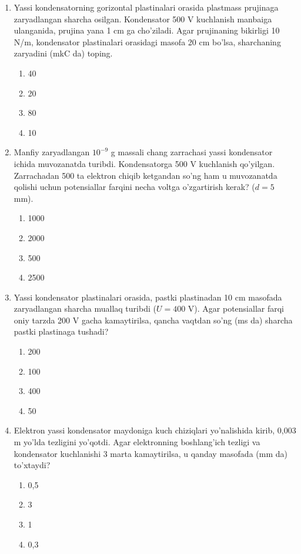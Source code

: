 \begin{enumerate}
    \item Yassi kondensatorning gorizontal plastinalari orasida plastmass prujinaga zaryadlangan sharcha osilgan. Kondensator 500 V kuchlanish manbaiga ulanganida, prujina yana 1 cm ga cho’ziladi. Agar prujinaning bikirligi 10 N/m, kondensator plastinalari orasidagi masofa 20 cm bo’lsa, sharchaning zaryadini (mkC da) toping.
    \begin{enumerate}[label=\Alph*)]
        \item 40 %
        \item 20
        \item 80
        \item 10
    \end{enumerate}

    \item Manfiy zaryadlangan $10^{-9}$ g massali chang zarrachasi yassi kondensator ichida muvozanatda turibdi. Kondensatorga 500 V kuchlanish qo'yilgan. Zarrachadan 500 ta elektron chiqib ketgandan so’ng ham u muvozanatda qolishi uchun potensiallar farqini necha voltga o’zgartirish kerak? ($d=5$ mm).
    \begin{enumerate}[label=\Alph*)]
        \item 1000
        \item 2000 %
        \item 500
        \item 2500
    \end{enumerate}

    \item Yassi kondensator plastinalari orasida, pastki plastinadan 10 cm masofada zaryadlangan sharcha muallaq turibdi ($U=400$ V). Agar potensiallar farqi oniy tarzda 200 V gacha kamaytirilsa, qancha vaqtdan so’ng (ms da) sharcha pastki plastinaga tushadi?
    \begin{enumerate}[label=\Alph*)]
        \item 200 %
        \item 100
        \item 400
        \item 50
    \end{enumerate}

    \item Elektron yassi kondensator maydoniga kuch chiziqlari yo’nalishida kirib, 0,003 m yo’lda tezligini yo'qotdi. Agar elektronning boshlang’ich tezligi va kondensator kuchlanishi 3 marta kamaytirilsa, u qanday masofada (mm da) to'xtaydi?
    \begin{enumerate}[label=\Alph*)]
        \item 0,5
        \item 3
        \item 1 %
        \item 0,3
    \end{enumerate}


\end{enumerate}
